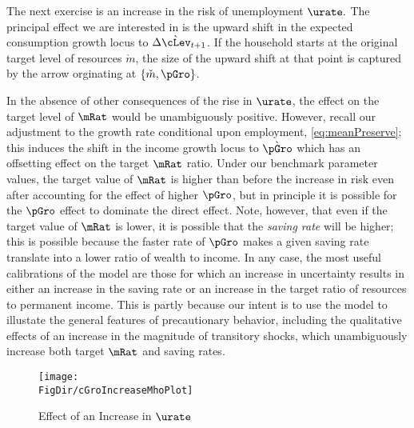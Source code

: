 \documentclass{\handout}
\begin{document}
The next exercise is an increase in the risk of unemployment $\urate.$
The principal effect we are interested in is the upward shift in the expected
consumption growth locus to $\Delta \grave{\cLev}_{t+1}$.  If the
household starts at the original target level of resources
$\grave{m}$, the size of the upward shift at that point is captured by the
arrow orginating at $\{\check{m},\pGro\}$.  

In the absence of other consequences of the rise in $\urate$, the
effect on the target level of $\mRat$ would be unambiguously positive.
However, recall our adjustment to the growth rate conditional upon
employment, \eqref{eq:meanPreserve}; this induces the shift in the
income growth locus to $\grave{\pGro}$ which has an offsetting effect
on the target $\mRat$ ratio.  Under our benchmark parameter values,
the target value of $\mRat$ is higher than before the increase in risk
even after accounting for the effect of higher $\pGro$, but in
principle it is possible for the $\pGro$ effect to dominate the direct
effect.  Note, however, that even if the target value of $\mRat$ is
lower, it is possible that the {\it saving rate} will be higher; this
is possible because the faster rate of $\pGro$ makes a given saving
rate translate into a lower ratio of wealth to income.  In any case,
the most useful calibrations of the model are those for
which an increase in uncertainty results in either an increase in the
saving rate or an increase in the target ratio of resources to
permanent income.  This is partly because our intent is to use the
model to illustate the general features of precautionary behavior,
including the qualitative effects of an increase in the magnitude of
transitory shocks, which unambiguously increase both target $\mRat$
and saving rates.

\begin{figure}
\caption{Effect of an Increase in $\urate$}
\texttt{[image: \\FigDir/cGroIncreaseMhoPlot]}
\label{fig:cGroIncreaseMhoPlot}
\end{figure}
\end{document}
